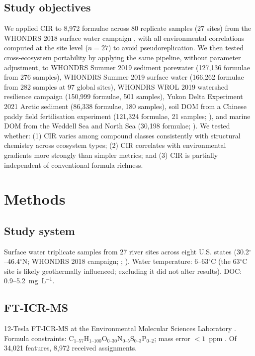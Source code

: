 \documentclass[12pt,letterpaper]{article}
\begin{document}
\subsection{Study objectives}

We applied CIR to 8,972 formulae across 80 replicate samples (27 sites) from the WHONDRS 2018 surface water campaign \citep{stegen2022,goldman2020}, with all environmental correlations computed at the site level ($n = 27$) to avoid pseudoreplication. We then tested cross-ecosystem portability by applying the same pipeline, without parameter adjustment, to WHONDRS Summer 2019 sediment porewater (127,136 formulae from 276 samples), WHONDRS Summer 2019 surface water (166,262 formulae from 282 samples at 97 global sites), WHONDRS WROL 2019 watershed resilience campaign (150,999 formulae, 501 samples), Yukon Delta Experiment 2021 Arctic sediment (86,338 formulae, 180 samples), soil DOM from a Chinese paddy field fertilisation experiment (121,324 formulae, 21 samples; \citealt{xia2025}), and marine DOM from the Weddell Sea and North Sea (30,198 formulae; \citealt{moye2025}). We tested whether: (1) CIR varies among compound classes consistently with structural chemistry across ecosystem types; (2) CIR correlates with environmental gradients more strongly than simpler metrics; and (3) CIR is partially independent of conventional formula richness.

\section{Methods}

\subsection{Study system}

Surface water triplicate samples from 27 river sites across eight U.S. states (30.2$^\circ$--46.4$^\circ$N; WHONDRS 2018 campaign; \citealt{stegen2022}; \citealt{goldman2020}). Water temperature: 6--63$^\circ$C (the 63$^\circ$C site is likely geothermally influenced; excluding it did not alter results). DOC: 0.9--5.2~mg~L$^{-1}$.

\subsection{FT-ICR-MS}

12-Tesla FT-ICR-MS at the Environmental Molecular Sciences Laboratory \citep{tfaily2015}. Formula constraints: C$_{1\text{--}57}$H$_{1\text{--}100}$O$_{0\text{--}30}$N$_{0\text{--}5}$S$_{0\text{--}3}$P$_{0\text{--}2}$; mass error $< 1$~ppm \citep{koch2007}. Of 34,021 features, 8,972 received assignments.
\end{document}
